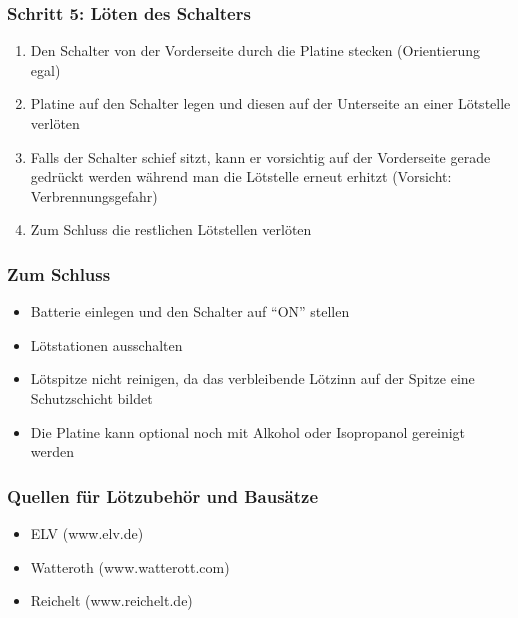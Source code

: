 \documentclass[10pt]{beamer}
\begin{document}
	\begin{frame}
	\frametitle{Schritt 5: Löten des Schalters}
	\begin{enumerate} 
		\item{Den Schalter von der Vorderseite durch die Platine stecken (Orientierung egal)}
		\item{Platine auf den Schalter legen und diesen auf der Unterseite an einer Lötstelle verlöten}
		\item{Falls der Schalter schief sitzt, kann er vorsichtig auf der Vorderseite gerade gedrückt werden während man die Lötstelle erneut erhitzt (Vorsicht: Verbrennungsgefahr)}
		\item{Zum Schluss die restlichen Lötstellen verlöten}
	\end{enumerate}
	\end{frame}

	\begin{frame}
	\frametitle{Zum Schluss}
	\begin{itemize} 
		\item{Batterie einlegen und den Schalter auf ``ON'' stellen}
		\item{Lötstationen ausschalten}
		\item{Lötspitze nicht reinigen, da das verbleibende Lötzinn auf der Spitze eine Schutzschicht bildet}
		\item{Die Platine kann optional noch mit Alkohol oder Isopropanol gereinigt werden}
	\end{itemize}
\end{frame}

	\begin{frame}
		\frametitle{Quellen für Lötzubehör und Bausätze}
		\begin{itemize}
			\item{ELV (www.elv.de)}
			\item{Watteroth (www.watterott.com)}
			\item{Reichelt (www.reichelt.de)}
		\end{itemize}
	\end{frame}

    
\end{document}
